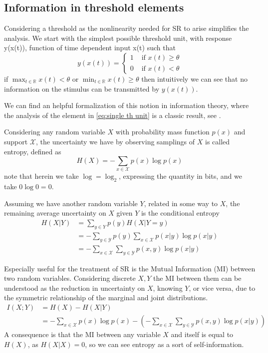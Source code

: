 \subsection{Information in threshold elements}
Considering a threshold as the nonlinearity needed for SR to arise simplifies the analysis. 
We start with the simplest possible threshold unit, with response y(x(t)), function of time dependent input x(t) such that 
\begin{equation}
\label{eq:single th unit}
    y(x(t)) = 
    \begin{cases}
        1 &\text{ if } x(t) \geq \theta\\
        0 &\text{ if } x(t)  < \theta
    \end{cases}
\end{equation}
if $\max_{t \in \mathbb{R}}x(t) < \theta$ or $\min_{t\in \mathbb{R}}x(t) \geq \theta$ then intuitively we can see that no information on the stimulus can be transmitted by $y(x(t))$. 

We can find an helpful formalization of this notion in information theory, where the analysis of the element in \ref{eq:single th unit} is a classic result, see \cite{Cover2006}.

Considering any random variable $X$ with probability mass function $p(x)$ and support $\mathcal{X}$, the uncertainty we have by observing samplings of $X$ is called entropy, defined as
\begin{equation}
    H(X) = - \sum_{x \in \mathcal{X}} p(x)\log p(x)
\end{equation}
note that herein we take $\log = \log_2$, expressing the quantity in bits, and we take $0\log 0 = 0$.

Assuming we have another random variable $Y$, related in some way to $X$, the remaining average uncertainty on $X$ given $Y$ is the conditional entropy
\begin{align}
    H(X|Y) &= \sum_{y \in Y} p(y) H(X|Y=y)\\
    &= -\sum_{y \in \mathcal{Y}}p(y)\sum_{x \in \mathcal{X}} p(x|y) \log p(x|y)\\
    &= -\sum_{x \in \mathcal{X}} \sum_{y \in \mathcal{Y}} p(x,y) \log p(x|y)
\end{align}

Especially useful for the treatment of SR is the Mutual Information (MI) between two random variables. 
Considering discrete $X,Y$ the MI between them can be understood as the reduction in uncertainty on $X$, knowing $Y$, or vice versa, due to the symmetric relationship of the marginal and joint distributions. %
\begin{align}
    \label{eq:MI}
    I(X;Y) &= H(X) - H(X|Y)\\
    &= -\sum_{x\in \mathcal{X}}p(x) \log p(x) -\left(-\sum_{x \in \mathcal{X}} \sum_{y \in \mathcal{Y}} p(x,y) \log p(x|y)\right)
\end{align}
A consequence is that the MI between any variable $X$ and itself is equal to $H(X)$, as $H(X|X) = 0$, so we can see entropy as a sort of self-information.

